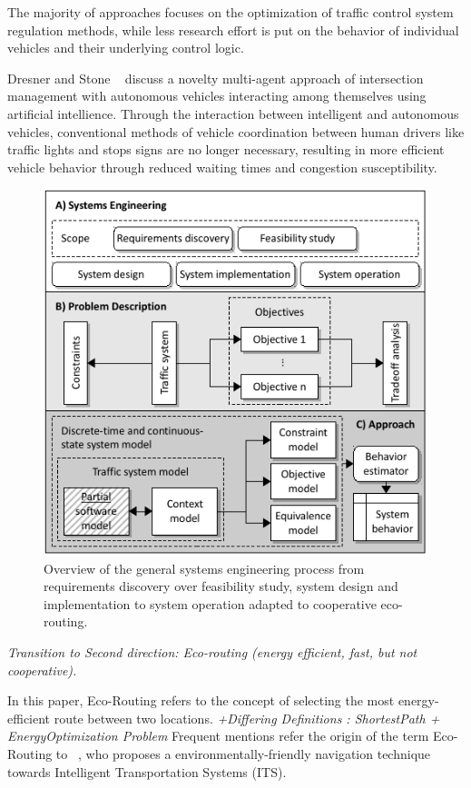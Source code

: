 \documentclass[conference]{../cls/IEEEtran}
\begin{document}
The majority of approaches focuses on the optimization of traffic control
system regulation methods, while less research effort is put
on the behavior of individual vehicles and their underlying control logic. 

Dresner and Stone ~\cite{Dresner2008} discuss a novelty multi-agent approach of
intersection management with autonomous vehicles interacting among themselves using artificial
intellience. Through the interaction between intelligent and autonomous
vehicles, conventional methods of vehicle coordination between human drivers like traffic lights and 
stops signs are no longer necessary, resulting in more efficient
vehicle behavior through reduced waiting times and congestion susceptibility.

\begin{figure}[b!]
	\includegraphics[width=\columnwidth]{../gfx/overview-variant.pdf}
	\caption{Overview of the general systems engineering process from requirements discovery over feasibility study, system design and implementation to system operation adapted to cooperative eco-routing.}
	\label{figure:process}
\end{figure}

\textit{Transition to Second direction: Eco-routing (energy efficient, fast, but
not cooperative).}

In this paper, Eco-Routing refers to the concept of selecting the most
energy-efficient route between two locations.
\textit{+Differing Definitions : ShortestPath + EnergyOptimization Problem}
Frequent mentions refer the origin of the term Eco-Routing to
~\cite{Barth2007}, who proposes a environmentally-friendly
navigation technique towards Intelligent Transportation Systems (ITS).
\end{document}
